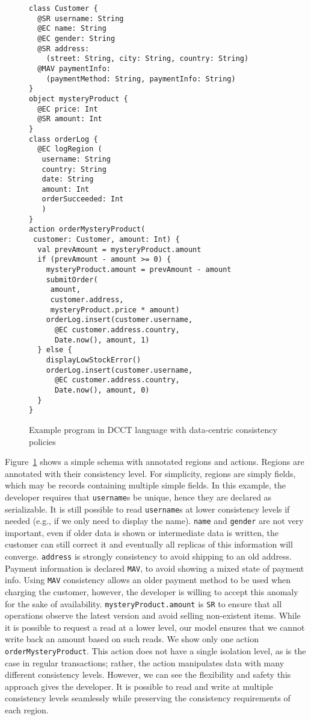 \documentclass[numbers]{sigplanconf}
\begin{document}
\begin{figure}[t!] 
\begin{lstlisting}[basicstyle=\small\ttfamily]
class Customer {
  @SR username: String
  @EC name: String
  @EC gender: String
  @SR address: 
    (street: String, city: String, country: String) 
  @MAV paymentInfo:
    (paymentMethod: String, paymentInfo: String)
}
object mysteryProduct {
  @EC price: Int
  @SR amount: Int
}
class orderLog {
  @EC logRegion (
   username: String
   country: String
   date: String
   amount: Int
   orderSucceeded: Int 
   )
}
action orderMysteryProduct(
 customer: Customer, amount: Int) {
  val prevAmount = mysteryProduct.amount
  if (prevAmount - amount >= 0) {
    mysteryProduct.amount = prevAmount - amount
    submitOrder(
     amount, 
     customer.address, 
     mysteryProduct.price * amount)
    orderLog.insert(customer.username, 
      @EC customer.address.country, 
      Date.now(), amount, 1)
  } else {
    displayLowStockError() 
    orderLog.insert(customer.username, 
      @EC customer.address.country, 
      Date.now(), amount, 0)
  }
}
\end{lstlisting}
\caption{Example program in DCCT language with data-centric consistency policies}
\label{fig:example}
\end{figure}

Figure~\ref{fig:example} shows a simple schema with annotated
regions and actions. Regions are annotated 
with their consistency level. For simplicity, regions are simply fields,
which may be records containing multiple simple fields.
%
In this example, the developer requires that \texttt{username}s be 
unique, hence they are declared as serializable.
It is still possible to read \texttt{username}s at lower
consistency levels if needed (e.g., if we only need to display the name). 
\texttt{name} and \texttt{gender} are not very important, even if older
data is shown or intermediate data is written, the customer can still correct
it and eventually all replicas of this information will converge.
\texttt{address} is strongly consistency to avoid shipping to an old address.
Payment information is declared \texttt{MAV}, to avoid showing a mixed state
of payment info. Using \texttt{MAV} consistency
allows an older payment method to be used when charging the customer,
however, the developer is willing to accept this anomaly for the sake of
availability. \texttt{mysteryProduct.amount} is \texttt{SR} to ensure that all operations
observe the latest version and avoid selling non-existent items. While it is possible to 
request a read at a lower level, our model ensures that we cannot write back an amount 
based on such reads.
%
We show only one action \texttt{orderMysteryProduct}. This action does
not have a single isolation level, as is the case in regular transactions;
rather, the action manipulates data with many different consistency levels.
However, we can see the flexibility and safety this approach gives the
developer. It is possible to read and write at multiple consistency levels
seamlessly while preserving the consistency requirements of each region.
\end{document}
